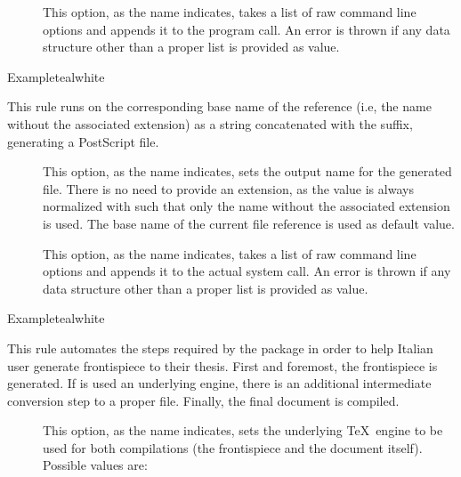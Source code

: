 \begin{description}
\begin{description}
\item[] This option, as the name indicates, takes a list of raw command line options and appends it to the  program call. An error is thrown if any data structure other than a proper list is provided as value.
\end{description}

\begin{codebox}{Example}{teal}{\icnote}{white}
\end{codebox}

\item[\rulebox{dvips}{Marco Daniel, Paulo Cereda}] This rule runs  on the corresponding base name of the  reference (i.e, the name without the associated extension) as a string concatenated with the  suffix, generating a PostScript  file.

\begin{description}
\item[] This option, as the name indicates, sets the output name for the generated  file. There is no need to provide an extension, as the value is always normalized with  such that only the name without the associated extension is used. The base name of the current file reference is used as default value.

\item[] This option, as the name indicates, takes a list of raw command line options and appends it to the actual system call. An error is thrown if any data structure other than a proper list is provided as value.
\end{description}

\begin{codebox}{Example}{teal}{\icnote}{white}
\end{codebox}

\item[\rulebox{frontespizio}{Francesco Endrici, Enrico Gregorio, Paulo Cereda}] This rule automates the steps required by the  package in order to help Italian user generate frontispiece to their thesis. First and foremost, the frontispiece is generated. If  is used an underlying engine, there is an additional intermediate conversion step to a proper  file. Finally, the final document is compiled.

\begin{description}
\item[] This option, as the name indicates, sets the underlying \TeX\ engine to be used for both compilations (the frontispiece and the document itself). Possible values are:


\end{description}
\end{description}
